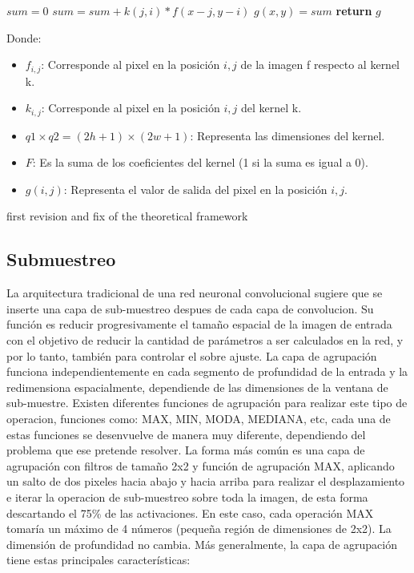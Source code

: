 \begin{itemize}
{\begin{algorithm}
\begin{algorithmic}[H]

  \State $sum=0$
           \State $sum=sum + k(j,i)*f(x-j,y-i)$
		\EndFor
	 \EndFor 
  \State $g(x,y)=sum$
\EndFor
\EndFor
\State \textbf{return} $g$
\EndProcedure
\end{algorithmic}
\end{algorithm}

Donde:
\begin{itemize}
\item $f_{i,j}$: Corresponde al pixel en la posición $i,j$ de la imagen f respecto al kernel k.
\item $k_{i,j}$: Corresponde al pixel en la posición $i,j$ del kernel k.
\item $q1\times q2 = (2h+1)\times(2w+1)$: Representa las dimensiones del kernel.
\item $F$: Es la suma de los coeficientes del kernel (1 si la suma es igual a 0).
\item $g(i,j)$: Representa el valor de salida del pixel en la posición $i,j$.
\end{itemize}}

\end{itemize}
first revision and fix of the theoretical framework

\subsection{Submuestreo}
La arquitectura tradicional de una red neuronal convolucional sugiere que se inserte una capa de sub-muestreo despues de cada capa de convolucion. Su función es reducir progresivamente el tamaño espacial de la imagen de entrada con el objetivo de reducir la cantidad de parámetros a ser calculados en la red, y por lo tanto, también para controlar el sobre ajuste. La capa de agrupación funciona independientemente en cada segmento de profundidad de la entrada y la redimensiona espacialmente, dependiende de las dimensiones de la ventana de sub-muestre. Existen diferentes funciones de agrupación para realizar este tipo de operacion, funciones como: MAX, MIN, MODA, MEDIANA, etc, cada una de estas funciones se desenvuelve de manera muy diferente, dependiendo del problema que ese pretende resolver. La forma más común es una capa de agrupación con filtros de tamaño 2x2 y función de agrupación MAX, aplicando un salto de dos pixeles hacia abajo y hacia arriba para realizar el desplazamiento e iterar la operacion de sub-muestreo sobre toda la imagen, de esta forma descartando el 75\% de las activaciones. En este caso, cada operación MAX tomaría un máximo de 4 números (pequeña región de dimensiones de 2x2). La dimensión de profundidad no cambia. Más generalmente, la capa de agrupación tiene estas principales características:

